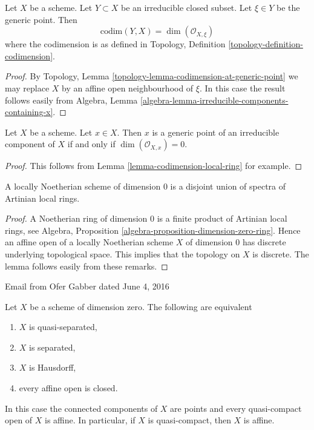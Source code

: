 \begin{lemma}
\label{lemma-codimension-local-ring}
Let $X$ be a scheme. Let $Y \subset X$ be an irreducible closed
subset. Let $\xi \in Y$ be the generic point. Then
$$
\text{codim}(Y, X) = \dim(\mathcal{O}_{X, \xi})
$$
where the codimension is as defined in
Topology, Definition \ref{topology-definition-codimension}.
\end{lemma}

\begin{proof}
By Topology, Lemma \ref{topology-lemma-codimension-at-generic-point}
we may replace $X$ by an affine open neighbourhood of $\xi$. In this
case the result follows easily from
Algebra, Lemma \ref{algebra-lemma-irreducible-components-containing-x}.
\end{proof}

\begin{lemma}
\label{lemma-generic-point}
Let $X$ be a scheme. Let $x \in X$. Then $x$ is a generic point of
an irreducible component of $X$ if and only if $\dim(\mathcal{O}_{X, x}) = 0$.
\end{lemma}

\begin{proof}
This follows from Lemma \ref{lemma-codimension-local-ring} for example.
\end{proof}

\begin{lemma}
\label{lemma-locally-Noetherian-dimension-0}
A locally Noetherian scheme of dimension $0$ is a disjoint
union of spectra of Artinian local rings.
\end{lemma}

\begin{proof}
A Noetherian ring of dimension $0$ is a finite product of Artinian local
rings, see
Algebra, Proposition \ref{algebra-proposition-dimension-zero-ring}.
Hence an affine open of a locally Noetherian scheme $X$ of dimension
$0$ has discrete underlying topological space. This implies that
the topology on $X$ is discrete. The lemma follows easily from these
remarks.
\end{proof}

\begin{lemma}
\label{lemma-dimension-zero}
\begin{reference}
Email from Ofer Gabber dated June 4, 2016
\end{reference}
Let $X$ be a scheme of dimension zero. The following are equivalent
\begin{enumerate}
\item $X$ is quasi-separated,
\item $X$ is separated,
\item $X$ is Hausdorff,
\item every affine open is closed.
\end{enumerate}
In this case the connected components of $X$ are points and every
quasi-compact open of $X$ is affine. In particular, if $X$
is quasi-compact, then $X$ is affine.
\end{lemma}

